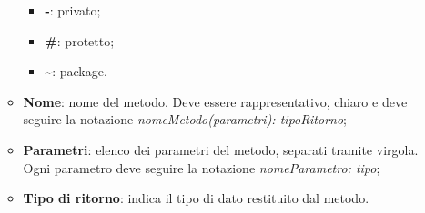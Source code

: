 \begin{enumerate}
\begin{itemize}
\begin{itemize}
			            \item \textbf{-}: privato;
			            \item \textbf{\#}: protetto;
			            \item \textbf{\textasciitilde}: package.
		            \end{itemize}
		      \item \textbf{Nome}: nome del metodo. Deve essere rappresentativo, chiaro e deve seguire la notazione \textit{nomeMetodo(parametri): tipoRitorno};
		      \item \textbf{Parametri}: elenco dei parametri del metodo, separati tramite virgola. Ogni parametro deve seguire la notazione \textit{nomeParametro: tipo};
		      \item \textbf{Tipo di ritorno}: indica il tipo di dato restituito dal metodo.
	      \end{itemize}
\end{enumerate}

